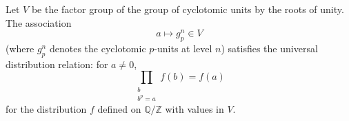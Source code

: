 Let $V$ be the factor group of the group of cyclotomic units by the roots of unity. The association
$$
a \longmapsto g^n_p \in V
$$
(where $g^n_p$ denotes the cyclotomic $p$-units at level $n$) satisfies the universal distribution relation: for $a \neq 0$,
$$
\prod_{\substack{b \\ b^p = a}} f(b) = f(a)
$$
for the distribution $f$ defined on $\mathbb{Q}/\mathbb{Z}$ with values in $V$.
